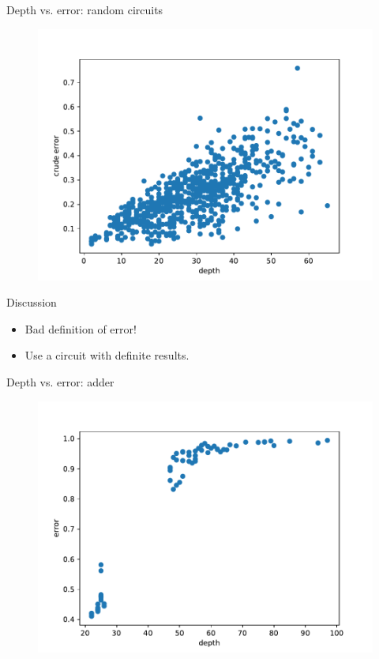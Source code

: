 \documentclass{beamer}
\begin{document}
\begin{frame}{Depth vs. error: random circuits}
	\begin{figure}[h]
		\centering
		\includegraphics[width=0.8\linewidth]{./figs/depth.pdf}
	\end{figure}
\end{frame}

\begin{frame}{Discussion}
	\begin{itemize}
		\item Bad definition of error!
		\item Use a circuit with definite results.
	\end{itemize}
\end{frame}

\begin{frame}{Depth vs. error: adder}
	\begin{figure}[h]
		\centering
		\includegraphics[width=0.8\linewidth]{./figs/adder_error.pdf}
	\end{figure}
\end{frame}
\end{document}
